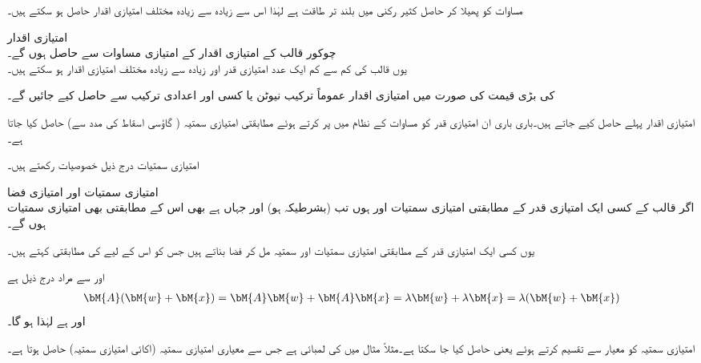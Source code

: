 مساوات  کو پھیلا کر حاصل کثیر رکنی میں  بلند تر طاقت ہے لہٰذا اس سے زیادہ سے زیادہ  مختلف امتیازی اقدار حاصل ہو سکتے ہیں۔ 

\quad امتیازی اقدار\\
چوکور قالب  کے امتیازی اقدار  کے امتیازی مساوات  سے حاصل ہوں گے۔\\
یوں  قالب کی کم سے کم ایک عدد امتیازی قدر اور زیادہ سے زیادہ  مختلف  امتیازی اقدار ہو سکتے ہیں۔

 کی بڑی قیمت کی صورت میں امتیازی اقدار عموماً ترکیب نیوٹن یا کسی اور اعدادی ترکیب سے حاصل کیے جائیں گے۔

امتیازی اقدار پہلے حاصل کیے جاتے ہیں۔باری باری ان امتیازی قدر کو مساوات  کے نظام میں پر کرتے ہوئے مطابقتی امتیازی سمتیہ ( گاؤسی اسقاط کی مدد سے) حاصل کیا جاتا ہے۔

امتیازی سمتیات درج ذیل خصوصیات رکھتے ہیں۔

\quad امتیازی سمتیات اور امتیازی فضا\\
اگر قالب  کے کسی ایک امتیازی قدر  کے مطابقتی امتیازی سمتیات  اور  ہوں تب  (بشرطیکہ  ہو) اور  جہاں  ہے بھی اس  کے مطابقتی بھی امتیازی سمتیات ہوں گے۔

یوں کسی ایک امتیازی قدر کے مطابقتی امتیازی سمتیات اور  سمتیہ مل کر فضا بناتے ہیں جس کو اس  کے لیے  کی مطابقتی   کہتے ہیں۔

 اور  سے مراد درج ذیل ہے
\begin{align*}
\bM{A}(\bM{w}+\bM{x})=\bM{A}\bM{w}+\bM{A}\bM{x}=\lambda \bM{w}+\lambda\bM{x}=\lambda(\bM{w}+\bM{x})
\end{align*}
اور  ہے لہٰذا  ہو گا۔

امتیازی سمتیہ کو معیار سے تقسیم کرتے ہوئے   یعنی  حاصل کیا جا سکتا ہے۔مثلاً مثال  میں  کی لمبائی  ہے جس سے معیاری امتیازی سمتیہ (اکائی امتیازی سمتیہ)  حاصل ہوتا ہے۔ 

